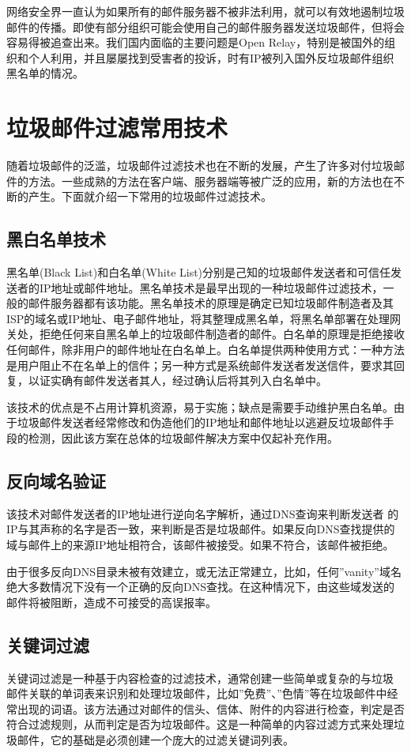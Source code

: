 网络安全界一直认为如果所有的邮件服务器不被非法利用，就可以有效地遏制垃圾邮件的传播。即使有部分组织可能会使用自己的邮件服务器发送垃圾邮件，但将会容易得被追查出来。我们国内面临的主要问题是Open Relay，特别是被国外的组织和个人利用，并且屡屡找到受害者的投诉，时有IP被列入国外反垃圾邮件组织黑名单的情况。
\section{垃圾邮件过滤常用技术}
随着垃圾邮件的泛滥，垃圾邮件过滤技术也在不断的发展，产生了许多对付垃圾邮件的方法。一些成熟的方法在客户端、服务器端等被广泛的应用，新的方法也在不断的产生。下面就介绍一下常用的垃圾邮件过滤技术。
\subsection{黑白名单技术}
黑名单(Black List)和白名单(White List)分别是己知的垃圾邮件发送者和可信任发 送者的IP地址或邮件地址。黑名单技术是最早出现的一种垃圾邮件过滤技术，一般的邮件服务器都有该功能。黑名单技术的原理是确定已知垃圾邮件制造者及其ISP的域名或IP地址、电子邮件地址，将其整理成黑名单，将黑名单部署在处理网关处，拒绝任何来自黑名单上的垃圾邮件制造者的邮件。白名单的原理是拒绝接收任何邮件，除非用户的邮件地址在白名单上。白名单提供两种使用方式：一种方法是用户阻止不在名单上的信件；另一种方式是系统邮件发送者发送信件，要求其回复，以证实确有邮件发送者其人，经过确认后将其列入白名单中。    

该技术的优点是不占用计算机资源，易于实施；缺点是需要手动维护黑白名单。由于垃圾邮件发送者经常修改和伪造他们的IP地址和邮件地址以逃避反垃圾邮件手段的检测，因此该方案在总体的垃圾邮件解决方案中仅起补充作用。

\subsection{反向域名验证}
该技术对邮件发送者的IP地址进行逆向名字解析，通过DNS查询来判断发送者 的IP与其声称的名字是否一致，来判断是否是垃圾邮件。如果反向DNS查找提供的域与邮件上的来源IP地址相符合，该邮件被接受。如果不符合，该邮件被拒绝。   

由于很多反向DNS目录未被有效建立，或无法正常建立，比如，任何”vanity”域名绝大多数情况下没有一个正确的反向DNS查找。在这种情况下，由这些域发送的邮件将被阻断，造成不可接受的高误报率。
\subsection{关键词过滤}
关键词过滤是一种基于内容检查的过滤技术，通常创建一些简单或复杂的与垃圾 邮件关联的单词表来识别和处理垃圾邮件，比如”免费”、”色情”等在垃圾邮件中经常出现的词语。该方法通过对邮件的信头、信体、附件的内容进行检查，判定是否符合过滤规则，从而判定是否为垃圾邮件。这是一种简单的内容过滤方式来处理垃圾邮件，它的基础是必须创建一个庞大的过滤关键词列表。      

